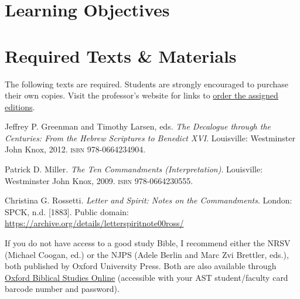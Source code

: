 \documentclass[titlepage]{article}
\newcommand\incl{../includes}
\begin{document}


  \section{Learning Objectives}
  \label{objectives}

  \edobject

\section{Required Texts \& Materials}
\label{texts}

The following texts are required. Students are strongly encouraged to
purchase their own copies. Visit the professor's website for links to
\href{https://danieldriver.com/courses/hb-3113/}{order the assigned editions}.

\begingroup
\renewcommand{\section}[2]{}%
\begin{thebibliography}{Centuries}%

	 Jeffrey P. Greenman and Timothy Larsen, eds.
	\emph{The Decalogue through the Centuries: From the Hebrew Scriptures to Benedict XVI}.
	Louisville: Westminster John Knox, 2012.
	\textsc{isbn} 978-0664234904.

	 Patrick D. Miller.
    \emph{The Ten Commandments (Interpretation)}.
    Louisville: Westminster John Knox, 2009.
    \textsc{isbn} 978-0664230555.

	 Christina G. Rossetti.
	\emph{Letter and Spirit: Notes on the Commandments}.
	London: SPCK, n.d. [1883].
	Public domain: \url{https://archive.org/details/letterspiritnote00ross/}

\end{thebibliography}
\endgroup

If you do not have access to a good study Bible, I recommend either the
NRSV (Michael Coogan, ed.) or the NJPS (Adele Berlin and Marc Zvi
Brettler, eds.), both published by Oxford University Press. Both are also available through \href{http://ezproxy.astheology.ns.ca:2048/login?url=http://www.oxfordbiblicalstudies.com/}{Oxford Biblical Studies Online} (accessible with your AST student/faculty card barcode number and password).
\end{document}
